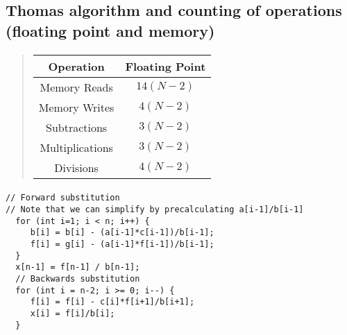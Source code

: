 \subsection*{Thomas algorithm and counting of operations (floating point and memory)}

\paragraph{}


\begin{quote}
\begin{tabular}{cc}
\hline
\multicolumn{1}{c}{ Operation } & \multicolumn{1}{c}{ Floating Point } \\
\hline
Memory Reads    & $14(N-2)$      \\
Memory Writes   & $4(N-2)$       \\
Subtractions    & $3(N-2)$       \\
Multiplications & $3(N-2)$       \\
Divisions       & $4(N-2)$       \\
\hline
\end{tabular}
\end{quote}

\noindent




\paragraph{}













\begin{verbatim}
// Forward substitution    
// Note that we can simplify by precalculating a[i-1]/b[i-1]
  for (int i=1; i < n; i++) {
     b[i] = b[i] - (a[i-1]*c[i-1])/b[i-1];
     f[i] = g[i] - (a[i-1]*f[i-1])/b[i-1];
  }
  x[n-1] = f[n-1] / b[n-1];
  // Backwards substitution                                                           
  for (int i = n-2; i >= 0; i--) {
     f[i] = f[i] - c[i]*f[i+1]/b[i+1];
     x[i] = f[i]/b[i];
  }

\end{verbatim}



